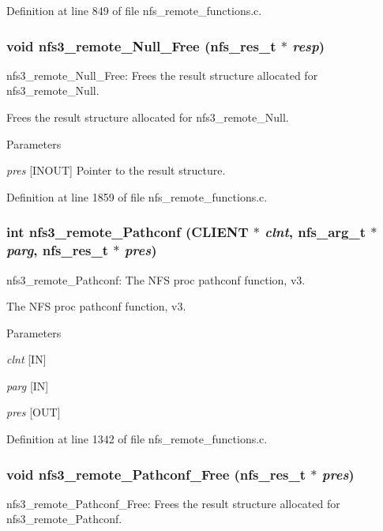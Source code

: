 Definition at line 849 of file nfs\_\-remote\_\-functions.c.
\subsubsection[{nfs3\_\-remote\_\-Null\_\-Free}]{\setlength{\rightskip}{0pt plus 5cm}void nfs3\_\-remote\_\-Null\_\-Free (nfs\_\-res\_\-t $\ast$ {\em resp})}\label{group__NFSprocs_ga0a08fff74b398494e4ffa49671558820}
nfs3\_\-remote\_\-Null\_\-Free: Frees the result structure allocated for nfs3\_\-remote\_\-Null.

Frees the result structure allocated for nfs3\_\-remote\_\-Null.


\begin{DoxyParams}{Parameters}
\item[{\em pres}][INOUT] Pointer to the result structure. \end{DoxyParams}


Definition at line 1859 of file nfs\_\-remote\_\-functions.c.
\subsubsection[{nfs3\_\-remote\_\-Pathconf}]{\setlength{\rightskip}{0pt plus 5cm}int nfs3\_\-remote\_\-Pathconf (CLIENT $\ast$ {\em clnt}, \/  nfs\_\-arg\_\-t $\ast$ {\em parg}, \/  nfs\_\-res\_\-t $\ast$ {\em pres})}\label{group__NFSprocs_ga7324608c74b467cc68a15cd3dc83a136}
nfs3\_\-remote\_\-Pathconf: The NFS proc pathconf function, v3.

The NFS proc pathconf function, v3.


\begin{DoxyParams}{Parameters}
\item[{\em clnt}][IN] \item[{\em parg}][IN] \item[{\em pres}][OUT] \end{DoxyParams}


Definition at line 1342 of file nfs\_\-remote\_\-functions.c.
\subsubsection[{nfs3\_\-remote\_\-Pathconf\_\-Free}]{\setlength{\rightskip}{0pt plus 5cm}void nfs3\_\-remote\_\-Pathconf\_\-Free (nfs\_\-res\_\-t $\ast$ {\em pres})}\label{group__NFSprocs_ga75f4f29ffcdaccec26fb2d1f95b93460}
nfs3\_\-remote\_\-Pathconf\_\-Free: Frees the result structure allocated for nfs3\_\-remote\_\-Pathconf.

